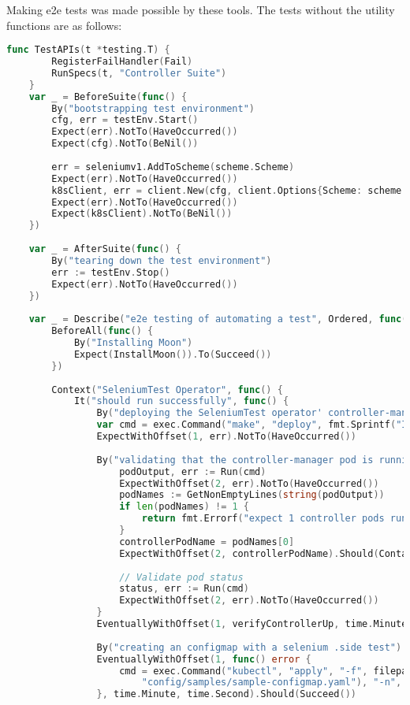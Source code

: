 Making e2e tests was made possible by these tools. The tests without the utility functions are as follows:

\begin{lstlisting}[language={Go}]
	func TestAPIs(t *testing.T) {
		RegisterFailHandler(Fail)
		RunSpecs(t, "Controller Suite")
	}
	var _ = BeforeSuite(func() {
		By("bootstrapping test environment")
		cfg, err = testEnv.Start()
		Expect(err).NotTo(HaveOccurred())
		Expect(cfg).NotTo(BeNil())
	
		err = seleniumv1.AddToScheme(scheme.Scheme)
		Expect(err).NotTo(HaveOccurred())
		k8sClient, err = client.New(cfg, client.Options{Scheme: scheme.Scheme})
		Expect(err).NotTo(HaveOccurred())
		Expect(k8sClient).NotTo(BeNil())
	})
	
	var _ = AfterSuite(func() {
		By("tearing down the test environment")
		err := testEnv.Stop()
		Expect(err).NotTo(HaveOccurred())
	})
	
	var _ = Describe("e2e testing of automating a test", Ordered, func() {
		BeforeAll(func() {
			By("Installing Moon")
			Expect(InstallMoon()).To(Succeed())
		})
	
		Context("SeleniumTest Operator", func() {
			It("should run successfully", func() {
				By("deploying the SeleniumTest operator' controller-manager")
				var cmd = exec.Command("make", "deploy", fmt.Sprintf("IMG=%s", operatorImage))
				ExpectWithOffset(1, err).NotTo(HaveOccurred())
	
				By("validating that the controller-manager pod is running as expected")
					podOutput, err := Run(cmd)
					ExpectWithOffset(2, err).NotTo(HaveOccurred())
					podNames := GetNonEmptyLines(string(podOutput))
					if len(podNames) != 1 {
						return fmt.Errorf("expect 1 controller pods running, but got %d", len(podNames))
					}
					controllerPodName = podNames[0]
					ExpectWithOffset(2, controllerPodName).Should(ContainSubstring("controller-manager"))
	
					// Validate pod status
					status, err := Run(cmd)
					ExpectWithOffset(2, err).NotTo(HaveOccurred())
				}
				EventuallyWithOffset(1, verifyControllerUp, time.Minute, time.Second).Should(Succeed())
	
				By("creating an configmap with a selenium .side test")
				EventuallyWithOffset(1, func() error {
					cmd = exec.Command("kubectl", "apply", "-f", filepath.Join(projectDir,
						"config/samples/sample-configmap.yaml"), "-n", namespace)
				}, time.Minute, time.Second).Should(Succeed())
	

\end{lstlisting}
